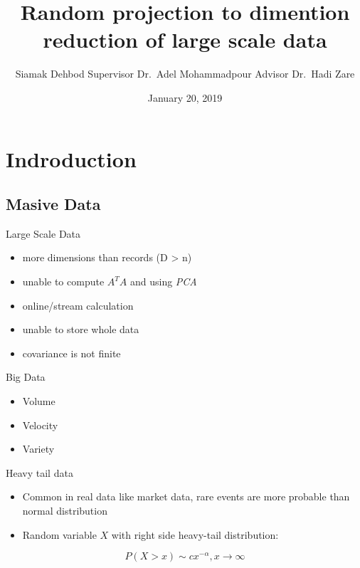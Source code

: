 \documentclass[ignorenonframetext,]{beamer}
\title{Random projection to dimention reduction of large scale data}
\author{Siamak Dehbod \newline \newline Supervisor Dr.~Adel Mohammadpour
\newline Advisor Dr.~Hadi Zare}
\institute{Amirkabir University of Technology}
\date{January 20, 2019}
\providecommand{\tightlist}{%
  \setlength{\itemsep}{0pt}\setlength{\parskip}{0pt}}
\begin{document}
\frame{\titlepage}

\begin{frame}
\tableofcontents[hideallsubsections]
\end{frame}

\section{Indroduction}\label{indroduction}

\subsection{Masive Data}\label{masive-data}

\begin{frame}{Large Scale Data}

\begin{itemize}
\tightlist
\item
  more dimensions than records (D \textgreater{} n)
\item
  unable to compute \(A^T A\) and using \emph{PCA}
\item
  online/stream calculation
\item
  unable to store whole data
\item
  covariance is not finite
\end{itemize}

\end{frame}

\begin{frame}{Big Data}

\begin{itemize}
\tightlist
\item
  Volume
\item
  Velocity
\item
  Variety
\end{itemize}

\end{frame}

\begin{frame}{Heavy tail data}

\begin{itemize}
\item
  Common in real data like market data, rare events are more probable
  than normal distribution
\item
  Random variable \(X\) with right side heavy-tail distribution:
\end{itemize}

\[ P(X > x) \sim cx^{-\alpha}, x \rightarrow \infty\]

\end{frame}
\end{document}
